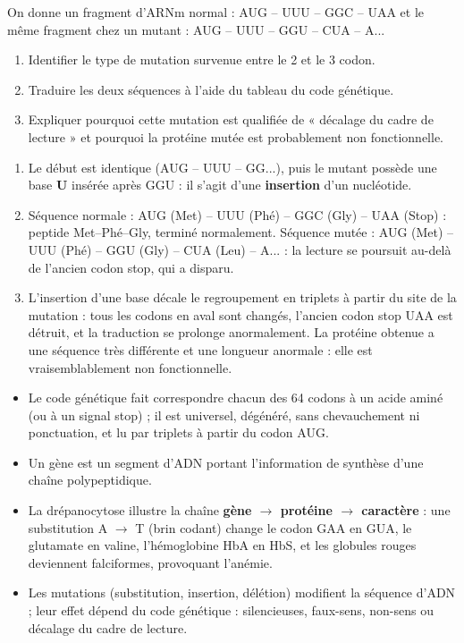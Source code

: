 \documentclass[11pt]{article}
\newcommand{\cle}[1]{{\popxbold\color{popdark}#1}}
\begin{document}
\begin{exercice}
On donne un fragment d'ARNm normal : AUG -- UUU -- GGC -- UAA et le même fragment chez un mutant : AUG -- UUU -- GGU -- CUA -- A...
\begin{enumerate}
\item Identifier le type de mutation survenue entre le 2\ieme{} et le 3\ieme{} codon.
\item Traduire les deux séquences à l'aide du tableau du code génétique.
\item Expliquer pourquoi cette mutation est qualifiée de « décalage du cadre de lecture » et pourquoi la protéine mutée est probablement non fonctionnelle.
\end{enumerate}
\end{exercice}

\begin{corrige}
\begin{enumerate}
\item Le début est identique (AUG -- UUU -- GG...), puis le mutant possède une base \textbf{U} insérée après GGU : il s'agit d'une \textbf{insertion} d'un nucléotide.
\item Séquence normale : AUG (Met) -- UUU (Phé) -- GGC (Gly) -- UAA (Stop) : peptide Met--Phé--Gly, terminé normalement. Séquence mutée : AUG (Met) -- UUU (Phé) -- GGU (Gly) -- CUA (Leu) -- A... : la lecture se poursuit au-delà de l'ancien codon stop, qui a disparu.
\item L'insertion d'une base décale le regroupement en triplets à partir du site de la mutation : tous les codons en aval sont changés, l'ancien codon stop UAA est détruit, et la traduction se prolonge anormalement. La protéine obtenue a une séquence très différente et une longueur anormale : elle est vraisemblablement non fonctionnelle.
\end{enumerate}
\end{corrige}

\begin{aretenir}
\begin{itemize}
\item Le \cle{code génétique} fait correspondre chacun des 64 codons à un acide aminé (ou à un signal stop) ; il est universel, dégénéré, sans chevauchement ni ponctuation, et lu par triplets à partir du codon AUG.
\item Un \cle{gène} est un segment d'ADN portant l'information de synthèse d'une chaîne polypeptidique.
\item La drépanocytose illustre la chaîne \textbf{gène $\rightarrow$ protéine $\rightarrow$ caractère} : une substitution A $\rightarrow$ T (brin codant) change le codon GAA en GUA, le glutamate en valine, l'hémoglobine HbA en HbS, et les globules rouges deviennent falciformes, provoquant l'anémie.
\item Les mutations (substitution, insertion, délétion) modifient la séquence d'ADN ; leur effet dépend du code génétique : silencieuses, faux-sens, non-sens ou décalage du cadre de lecture.
\end{itemize}
\end{aretenir}
\end{document}
